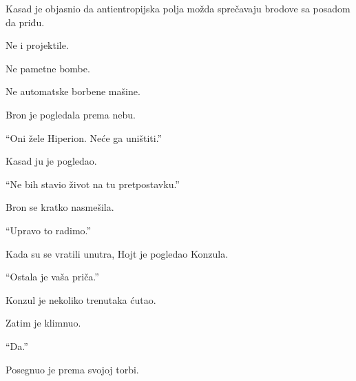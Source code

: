 Kasad je objasnio da antientropijska polja možda sprečavaju brodove sa posadom da priđu.

Ne i projektile.

Ne pametne bombe.

Ne automatske borbene mašine.

Bron je pogledala prema nebu.

``Oni žele Hiperion. Neće ga uništiti.''

Kasad ju je pogledao.

``Ne bih stavio život na tu pretpostavku.''

Bron se kratko nasmešila.

``Upravo to radimo.''

\bigskip

Kada su se vratili unutra, Hojt je pogledao Konzula.

``Ostala je vaša priča.''

Konzul je nekoliko trenutaka ćutao.

Zatim je klimnuo.

``Da.''

Posegnuo je prema svojoj torbi.

